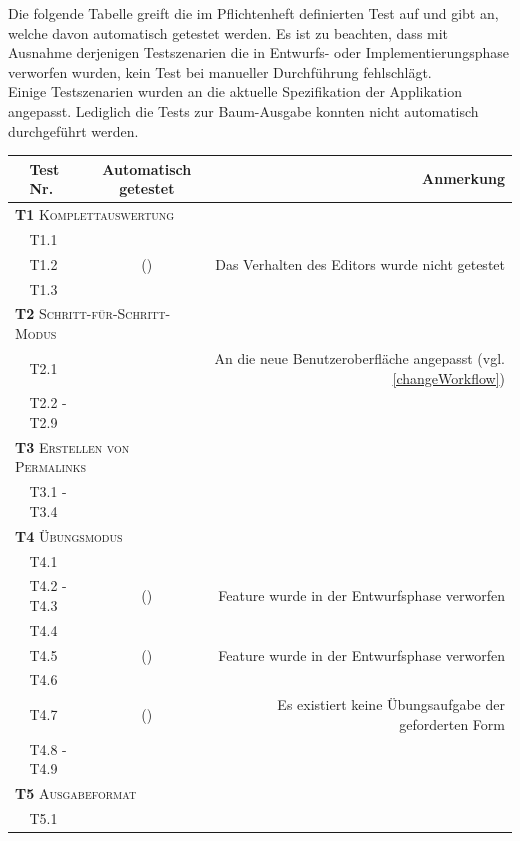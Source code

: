 \documentclass[parskip=full,11pt,openany]{scrreprt}
\newcommand{\cmark}{\ding{51}}%
\newcommand{\xmark}{\ding{55}}%
\begin{document}
Die folgende Tabelle greift die im Pflichtenheft definierten Test auf und gibt an,
welche davon automatisch getestet werden. 
Es ist zu beachten, dass mit Ausnahme derjenigen Testszenarien die in Entwurfs- oder
Implementierungsphase verworfen wurden, kein Test bei manueller Durchführung fehlschlägt.\\
Einige Testszenarien wurden an die aktuelle Spezifikation der Applikation angepasst. 
Lediglich die Tests zur Baum-Ausgabe konnten nicht automatisch durchgeführt werden.

\begin{table}[h]
	\centering
	\begin{tabular}{@{}ll|c|r@{}}
		\toprule
		&\textbf{Test Nr.} & \makecell{\textbf{Automatisch}\\\textbf{getestet}} &\textbf{Anmerkung} \\ 
		\midrule
		\multicolumn{3}{l|}{\small \textsc{\textbf{T1} Komplettauswertung}} \\ 
		&T1.1 & \cmark & \\
		&T1.2 & (\cmark) & Das Verhalten des Editors wurde nicht getestet \\
		&T1.3 & \cmark & \\ 
		\multicolumn{3}{l|}{\small \textsc{\textbf{T2} Schritt-für-Schritt-Modus}}\\ 
		&T2.1 & \cmark & An die neue Benutzeroberfläche angepasst (vgl. \ref{changeWorkflow}) \\
		&T2.2 - T2.9 & \cmark & \\
		\multicolumn{3}{l|}{\small \textsc{\textbf{T3} Erstellen von Permalinks}}\\ 	
		&T3.1 - T3.4 & \cmark & \\
		\multicolumn{3}{l|}{\small \textsc{\textbf{T4} Übungsmodus}}\\ 
		&T4.1 & \cmark & \\
		&T4.2 - T4.3 & (\xmark) & Feature wurde in der Entwurfsphase verworfen \\
		&T4.4 & \cmark & \\
		&T4.5 & (\xmark) & Feature wurde in der Entwurfsphase verworfen \\
		&T4.6 & \cmark & \\
		&T4.7 & (\xmark) & Es existiert keine Übungsaufgabe der geforderten Form \\
		&T4.8 - T4.9 & \cmark & \\
		\multicolumn{3}{l|}{\small \textsc{\textbf{T5} Ausgabeformat}}\\ 
		&T5.1 & \cmark & \\

\end{tabular}
\end{table}
\end{document}
